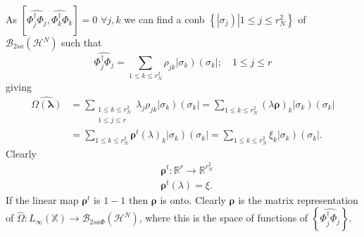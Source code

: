\documentclass[aps,preprint]{revtex4}%
\begin{document}
As $\left[  \widehat{\Phi_{j}^{\dagger}\Phi_{j}}\widehat{,\Phi_{k}^{\dagger
}\Phi_{k}}\right]  =0$ $\forall j,k$ we can find a conb $\left\{  \left.
\left\vert \sigma_{j}\right)  \right\vert 1\leq j\leq r_{N}^{2}\right\}  $ of
$\mathcal{B}_{2sa}\left(  \mathcal{H}^{N}\right)  $ such that
\begin{equation}
\widehat{\Phi_{j}^{\dagger}\Phi_{j}}=\sum_{1\leq k\leq r_{N}^{2}}\rho
_{jk}\left\vert \sigma_{k}\right)  \left(  \sigma_{k}\right\vert ;\quad1\leq
j\leq r
\end{equation}
giving
\begin{align}
\widehat{\Omega\left(  \mathbf{\lambda}\right)  }  &  =\sum_{\substack{1\leq
k\leq r_{N}^{2}\\1\leq j\leq r}}\lambda_{j}\rho_{jk}\left\vert \sigma
_{k}\right)  \left(  \sigma_{k}\right\vert =\sum_{1\leq k\leq r_{N}^{2}%
}\left(  \lambda\mathbf{\rho}\right)  _{k}\left\vert \sigma_{k}\right)
\left(  \sigma_{k}\right\vert \nonumber\\
&  =\sum_{1\leq k\leq r_{N}^{2}}\mathbf{\rho}^{t}\left(  \lambda\right)
_{k}\left\vert \sigma_{k}\right)  \left(  \sigma_{k}\right\vert =\sum_{1\leq
k\leq r_{N}^{2}}\xi_{k}\left\vert \sigma_{k}\right)  \left(  \sigma
_{k}\right\vert .
\end{align}
Clearly
\begin{align}
&  \mathbf{\rho}^{t}:\mathbb{R}^{r}\rightarrow\mathbb{R}^{r_{N}^{2}%
}\nonumber\\
&  \mathbf{\rho}^{t}\left(  \lambda\right)  =\xi.
\end{align}
If the linear map $\mathbf{\rho}^{t}$ is $1-1$ then $\mathbf{\rho}$ is onto.
Clearly $\mathbf{\rho}$ is the matrix representation of $\widehat{\Omega
}:L_{\infty}\left(  \mathbb{X}\right)  \rightarrow\mathcal{B}_{2sa\Phi}\left(
\mathcal{H}^{N}\right)  $, where this is the space of functions of $\left\{
\widehat{\Phi_{j}^{\dagger}\Phi_{j}}\right\}  .$
\end{document}
